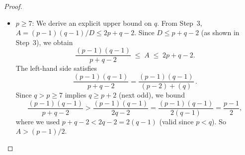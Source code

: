 \documentclass[12pt,a4paper]{amsart}
\theoremstyle{definition}
\begin{document}
\begin{proof}
\begin{itemize}
\begin{itemize}
                \textit{Computational verification (belt-and-suspenders).}
                As an independent cross-check, an exhaustive computer search
                over all primes $5 < q \le 10{,}000$ confirms that no valid
                prime triple $(5, q, r)$ with $r > q$ prime and
                $\varphi(5qr) \mid (5qr - 1)$ exists in this range.
                (The search is finite because the elementary argument above
                guarantees no solution for $q \ge 17$; the range $17 \le q \le
                10{,}000$ is verified computationally for completeness.)
        \end{itemize}
  \item $p \ge 7$: We derive an explicit upper bound on $q$.
        From Step~3, $A = (p-1)(q-1)/D \le 2p+q-2$.
        Since $D \le p+q-2$ (as shown in Step~3), we obtain
        \[
          \frac{(p-1)(q-1)}{p+q-2} \;\le\; A \;\le\; 2p + q - 2.
        \]
        The left-hand side satisfies
        \[
          \frac{(p-1)(q-1)}{p+q-2}
          = \frac{(p-1)(q-1)}{(p-2)+(q)}\,.
        \]
        Since $q > p \ge 7$ implies $q \ge p+2$ (next odd), we bound
        \[
          \frac{(p-1)(q-1)}{p+q-2}
          > \frac{(p-1)(q-1)}{2q-2}
          = \frac{(p-1)(q-1)}{2(q-1)}
          = \frac{p-1}{2},
        \]
        where we used $p + q - 2 < 2q - 2 = 2(q-1)$ (valid since $p < q$).
        So $A > (p-1)/2$.


\end{itemize}
\end{proof}
\end{document}
